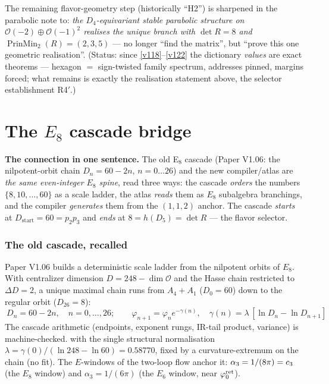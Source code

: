 \noindent The remaining flavor-geometry step (historically ``H2'') is sharpened in the parabolic note to:
\emph{the $D_4$-equivariant stable parabolic structure on $\mathcal O(-2)\oplus\mathcal O(-1)^2$ realises
the unique branch with $\det R=8$ and $\operatorname{PrinMin}_2(R)=(2,3,5)$} --- no longer ``find the
matrix'', but ``prove this one geometric realisation''. (Status: since \vref{v118}--\vref{v122} the dictionary
\emph{values} are exact theorems --- hexagon $=$ sign-twisted family spectrum, addresses pinned, margins
forced; what remains is exactly the realisation statement above, the selector establishment R4$'$.)

\clearpage
\part{The $E_8$ cascade bridge}
\noindent\textbf{The connection in one sentence.}
The old E$_8$ cascade (Paper V1.06: the nilpotent-orbit chain $D_n=60-2n$, $n=0\ldots26$) and the new
compiler/atlas are \emph{the same even-integer $E_8$ spine}, read three ways: the cascade \emph{orders}
the numbers $\{8,10,\dots,60\}$ as a scale ladder, the atlas \emph{reads} them as $E_8$ subalgebra
branchings, and the compiler \emph{generates} them from the $(1,1,2)$ anchor. The cascade \emph{starts}
at $D_{\mathrm{start}}=60=p_2p_3$ and \emph{ends} at $8=h(D_5)=\det R$ --- the flavor selector.

\section{The old cascade, recalled}
Paper V1.06 builds a deterministic scale ladder from the nilpotent orbits of $E_8$. With centralizer
dimension $D=248-\dim\mathcal O$ and the Hasse chain restricted to $\Delta D=2$, a unique maximal chain
runs from $A_4{+}A_1$ ($D_0=60$) down to the regular orbit ($D_{26}=8$):
\[
  \boxed{\ D_n=60-2n,\quad n=0,\dots,26;\qquad \varphi_{n+1}=\varphi_n e^{-\gamma(n)},\quad
  \gamma(n)=\lambda\,[\ln D_n-\ln D_{n+1}]\ }
\]
\noindent The cascade arithmetic (endpoints, exponent rungs, IR-tail product, variance) is
machine-checked.
with the single structural normalisation $\lambda=\gamma(0)/(\ln248-\ln60)=0.58770$, fixed by a
curvature-extremum on the chain (no fit). The $E$-windows of the two-loop flow anchor it: $\alpha_3=1/(8\pi)=c_3$
(the $E_8$ window) and $\alpha_3=1/(6\pi)$ (the $E_6$ window, near $\varphi_0^{\mathrm{ret}}$).

